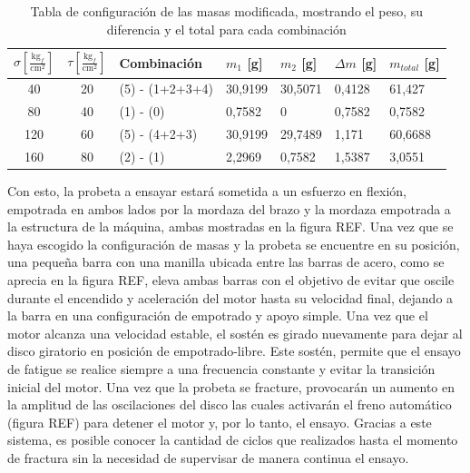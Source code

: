\begin{table}[h]
\centering
\label{tab:ejemplo_config}
\begin{tabular}{@{}cclllll@{}}
\toprule
$\sigma \left[\frac{\text{kg}_f}{\text{cm}^2}\right]$ & {$\tau \left[\frac{\text{kg}_f}{\text{cm}^2}\right]$} & Combinación     & $m_1$ {[}g{]} & $m_2$ {[}g{]} & $\Delta m$ {[}g{]} & $m_{total}$ {[}g{]} \\ \midrule
40                                                   & 20                                                                    & (5) - (1+2+3+4) & 30,9199       & 30,5071       & 0,4128             & 61,427              \\
80                                                   & 40                                                                    & (1) - (0)       & 0,7582        & 0             & 0,7582             & 0,7582              \\
120                                                  & 60                                                                    & (5) - (4+2+3)   & 30,9199       & 29,7489       & 1,171              & 60,6688             \\
160                                                  & 80                                                                    & (2) - (1)       & 2,2969        & 0,7582        & 1,5387             & 3,0551              \\ \bottomrule
\end{tabular}
\caption{Tabla de configuración de las masas modificada, mostrando el peso, su diferencia y el total para cada combinación}
\end{table}

Con esto, la probeta a ensayar estará sometida a un esfuerzo en flexión, empotrada en ambos lados por la mordaza del brazo y la mordaza empotrada a la estructura de la máquina, ambas mostradas en la figura REF. Una vez que se haya escogido la configuración de masas y la probeta se encuentre en su posición, una pequeña barra con una manilla ubicada entre las barras de acero, como se aprecia en la figura REF, eleva ambas barras con el objetivo de evitar que oscile durante el encendido y aceleración del motor hasta su velocidad final, dejando a la barra en una configuración de empotrado y apoyo simple. Una vez que el motor alcanza una velocidad estable, el sostén es girado nuevamente para dejar al disco giratorio en posición de empotrado-libre. Este sostén, permite que el ensayo de fatigue se realice siempre a una frecuencia constante y evitar la transición inicial del motor. Una vez que la probeta se fracture, provocarán un aumento en la amplitud de las oscilaciones del disco las cuales activarán el freno automático (figura REF) para detener el motor y, por lo tanto, el ensayo. Gracias a este sistema, es posible conocer la cantidad de ciclos que realizados hasta el momento de fractura sin la necesidad de supervisar de manera continua el ensayo.

